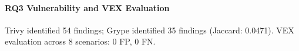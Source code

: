 \paragraph{RQ3 Vulnerability and VEX Evaluation}
Trivy identified 54 findings; Grype identified 35 findings (Jaccard: 0.0471). 
VEX evaluation across 8 scenarios: 0 FP, 0 FN.